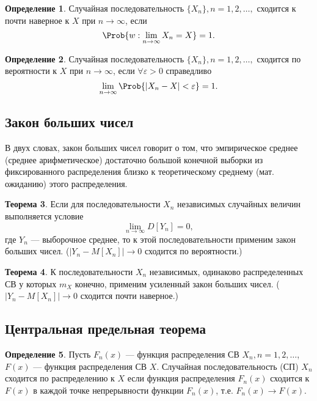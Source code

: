\documentclass[12pt]{report}
\theoremstyle{definition}
\newtheorem{theorem}{Теорема}[chapter]
\newtheorem{definition}[theorem]{Определение}
\begin{document}
\begin{definition}
Случайная последовательность $\{X_n\}, n = 1, 2, \dots,$ сходится к
почти наверное к $X$ при $n \rightarrow \infty$, если 
$$
\Prob\{w: \lim\limits_{n \rightarrow \infty} X_n = X\} = 1.
$$
\end{definition}

\begin{definition}
Случайная последовательность $\{X_n\}, n = 1, 2, \dots,$ сходится
по вероятности к $X$ при $n \rightarrow \infty$, если
$\forall \varepsilon > 0$ справедливо
$$
\lim\limits_{n \rightarrow \infty} \Prob\{|X_n - X| < \varepsilon\} = 1.
$$
\end{definition}

\subsection{Закон больших чисел}

В двух словах, закон больших чисел говорит о том, что
эмпирическое среднее (среднее арифметическое) достаточно большой конечной выборки
из фиксированного распределения близко к теоретическому среднему (мат. ожиданию)
этого распределения.

\begin{theorem}
Если для последовательности $X_n$ независимых случайных величин
выполняется условие
$$
\lim\limits_{n\rightarrow \infty} D[Y_n] = 0,
$$
где $Y_n$ --- выборочное среднее, то к этой последовательности
применим закон больших чисел.
($|Y_n - M[X_n]| \rightarrow 0$ сходится по вероятности.)
\end{theorem}

\begin{theorem}
К последовательности $X_n$ независимых, одинаково распределенных
СВ у которых $m_X$ конечно, применим усиленный закон больших чисел.
($|Y_n - M[X_n]| \rightarrow 0$ сходится почти наверное.)
\end{theorem}

\subsection{Центральная предельная теорема}

\begin{definition}
Пусть $F_n(x)$ --- функция распределения СВ $X_n, n = 1, 2, \dots$,
$F(x)$ --- функция распределения СВ $X$.
Случайная последовательность (СП) $X_n$ сходится по распределению к $X$
если функция распределения $F_n(x)$ сходится к $F(x)$ в каждой точке
непрерывности функции $F_n(x)$, т.е. $F_n(x) \rightarrow F(x)$.
\end{definition}
\end{document}
